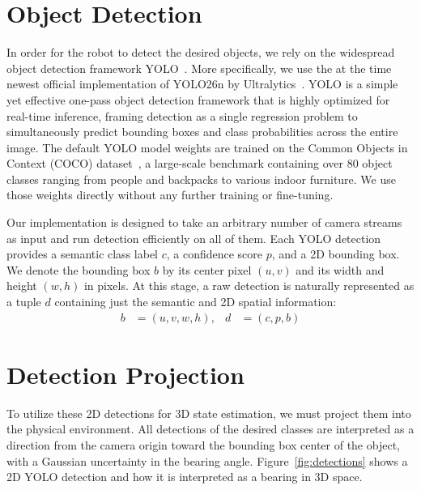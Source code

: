 \documentclass[
	parspace, %
	noindent, %
	final, %
]{elteikthesis}
\begin{document}
\section{Object Detection}
In order for the robot to detect the desired objects, we rely on the widespread object detection framework YOLO~\cite{look_joseph_2016}. More specifically, we use the at the time newest official implementation of YOLO26n by Ultralytics~\cite{Jocher_Ultralytics_YOLO_2023}. YOLO is a simple yet effective one-pass object detection framework that is highly optimized for real-time inference, framing detection as a single regression problem to simultaneously predict bounding boxes and class probabilities across the entire image. The default YOLO model weights are trained on the Common Objects in Context (COCO) dataset~\cite{microsoft_lin_2014}, a large-scale benchmark containing over 80 object classes ranging from people and backpacks to various indoor furniture. We use those weights directly without any further training or fine-tuning.

Our implementation is designed to take an arbitrary number of camera streams as input and run detection efficiently on all of them. Each YOLO detection provides a semantic class label $c$, a confidence score $p$, and a 2D bounding box. We denote the bounding box $b$ by its center pixel $(u,v)$ and its width and height $(w,h)$ in pixels. At this stage, a raw detection is naturally represented as a tuple $d$ containing just the semantic and 2D spatial information:
\begin{align}
b &= (u, v, w, h),
& d &= (c, p, b)
\end{align}

\section{Detection Projection}
To utilize these 2D detections for 3D state estimation, we must project them into the physical environment. All detections of the desired classes are interpreted as a direction from the camera origin toward the bounding box center of the object, with a Gaussian uncertainty in the bearing angle. Figure~\ref{fig:detections} shows a 2D YOLO detection and how it is interpreted as a bearing in 3D space.
\end{document}
